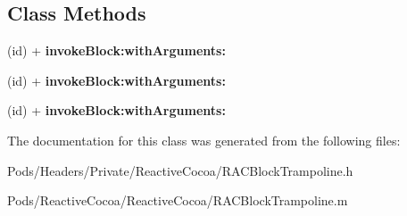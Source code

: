 \subsection*{Class Methods}
\begin{DoxyCompactItemize}
\item 
\mbox{\label{interface_r_a_c_block_trampoline_af45fee337e58b4bd4313bcd6e24b87c2}} 
(id) + {\bfseries invoke\+Block\+:with\+Arguments\+:}
\item 
\mbox{\label{interface_r_a_c_block_trampoline_af45fee337e58b4bd4313bcd6e24b87c2}} 
(id) + {\bfseries invoke\+Block\+:with\+Arguments\+:}
\item 
\mbox{\label{interface_r_a_c_block_trampoline_af45fee337e58b4bd4313bcd6e24b87c2}} 
(id) + {\bfseries invoke\+Block\+:with\+Arguments\+:}
\end{DoxyCompactItemize}


The documentation for this class was generated from the following files\+:\begin{DoxyCompactItemize}
\item 
Pods/\+Headers/\+Private/\+Reactive\+Cocoa/R\+A\+C\+Block\+Trampoline.\+h\item 
Pods/\+Reactive\+Cocoa/\+Reactive\+Cocoa/R\+A\+C\+Block\+Trampoline.\+m\end{DoxyCompactItemize}
